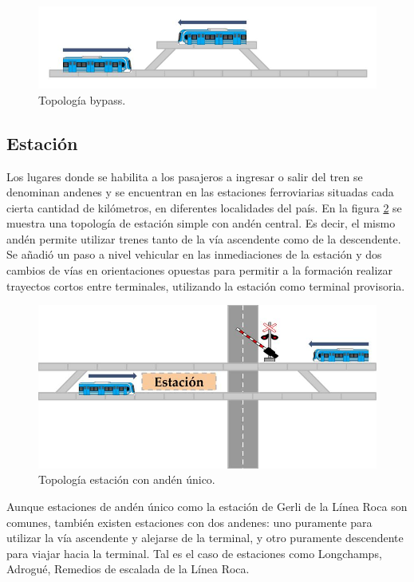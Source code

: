 		\begin{figure}[h]
		\centering
			\includegraphics[scale=.45]{./Figures/Bypass_2}
			\caption{Topología bypass.}
			\label{fig:Bypass_T}
		\end{figure}

	\vspace{5cm}
				
	\subsection{Estación}

		Los lugares donde se habilita a los pasajeros a ingresar o salir del tren se denominan andenes y se encuentran en las estaciones ferroviarias situadas cada cierta cantidad de kilómetros, en diferentes localidades del país. En la figura \ref{fig:Estacion} se muestra una topología de estación simple con andén central. Es decir, el mismo andén permite utilizar trenes tanto de la vía ascendente como de la descendente. Se añadió un paso a nivel vehicular en las inmediaciones de la estación y dos cambios de vías en orientaciones opuestas para permitir a la formación realizar trayectos cortos entre terminales, utilizando la estación como terminal provisoria.
		
			\begin{figure}[h]
			\centering
				\includegraphics[scale=.45]{./Figures/Estacion}
				\caption{Topología estación con andén único.}
				\label{fig:Estacion}
			\end{figure}
		
		Aunque estaciones de andén único como la estación de Gerli de la Línea Roca son comunes, también existen estaciones con dos andenes: uno puramente para utilizar la vía ascendente y alejarse de la terminal, y otro puramente descendente para viajar hacia la terminal. Tal es el caso de estaciones como Longchamps, Adrogué, Remedios de escalada de la Línea Roca.

